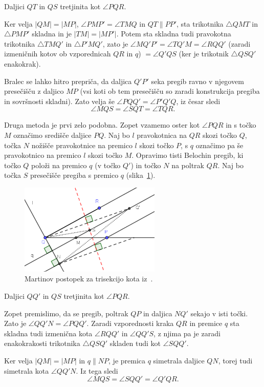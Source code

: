 \begin{trditev}
    Daljici $QT$ in $QS$ tretjinita kot $\angle PQR$.
\end{trditev}
\begin{dokaz}
    Ker velja $|QM| = |MP|$, $\angle PMP' = \angle TMQ$ in $QT \parallel PP'$, sta trikotnika $\triangle QMT$ in $\triangle PMP'$ skladna in je $|TM| = |MP'|$. Potem sta skladna tudi pravokotna trikotnika $\triangle TMQ'$ in $\triangle P'MQ'$, zato je $\angle MQ'P' = \angle TQ'M = \angle RQQ'$ (zaradi izmeničnih kotov ob vzporednicah $QR$ in $q$) $= \angle Q'QS$ (ker je trikotnik $\triangle QSQ'$ enakokrak).
    
    Bralec se lahko hitro prepriča, da daljica $Q'P'$ seka pregib ravno v njegovem presečišču z daljico $MP$ (vsi koti ob tem presečišču so zaradi konstrukcija pregiba in sovršnosti skladni). Zato velja še $\angle PQQ' = \angle P'Q'Q$, iz česar sledi
    $$ \angle MQS = \angle SQT = \angle TQR.$$
\end{dokaz}

Druga metoda je prvi zelo podobna. Zopet vzamemo oster kot $\angle PQR$ in s točko $M$ označimo središče daljice $PQ$. Naj bo $l$ pravokotnica na $QR$ skozi točko $Q$, točka $N$ nožišče pravokotnice na premico $l$ skozi točko $P$, s $q$ označimo pa še pravokotnico na premico $l$ skozi točko $M$. Opravimo tisti Belochin pregib, ki točko $Q$ položi na premico $q$ (v točko $Q'$) in točko $N$ na poltrak $QR$. Naj bo točka $S$ presečišče pregiba s premico $q$ (slika~\ref{fig:trisection_10.14}).

\begin{figure}[h]
    \centering
    \includegraphics[width=0.6\textwidth]{images/starogr_problemi/trisection_10.14.png}
    \caption[Martinova trisekcija ostrega kota (metoda $2$)]{Martinov postopek za trisekcijo kota iz~\cite[str.\ 158--159]{geometricconstructions}.}
    \label{fig:trisection_10.14}
\end{figure}

\begin{trditev}
    Daljici $QQ'$ in $QS$ tretjinita kot $\angle PQR$.
\end{trditev}
\begin{dokaz}
    Zopet premislimo, da se pregib, poltrak $QP$ in daljica $NQ'$ sekajo v isti točki. Zato je $\angle QQ'N = \angle PQQ'$. Zaradi vzporednosti kraka $QR$ in premice $q$ sta skladna tudi izmenična kota $\angle RQQ'$ in $\angle QQ'S$, z njima pa je zaradi enakokrakosti trikotnika $\triangle QSQ'$ skladen tudi kot $\angle SQQ'$.

    Ker velja $|QM| = |MP|$ in $q \parallel NP$, je premica $q$ simetrala daljice $QN$, torej tudi simetrala kota $\angle QQ'N$. Iz tega sledi
    $$ \angle MQS = \angle SQQ' = \angle Q'QR.$$
\end{dokaz}